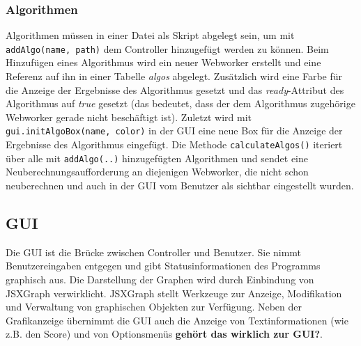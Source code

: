 \documentclass[a4paper,twocolumn]{scrartcl}
\begin{document}
\subsubsection{Algorithmen}
Algorithmen müssen in einer Datei als Skript abgelegt sein, um mit \texttt{addAlgo(name, path)} dem Controller hinzugefügt werden zu können. Beim Hinzufügen eines Algorithmus wird ein neuer Webworker erstellt und eine Referenz auf ihn in einer Tabelle \emph{algos} abgelegt. Zusätzlich wird eine Farbe für die Anzeige der Ergebnisse des Algorithmus gesetzt und das \emph{ready}-Attribut des Algorithmus auf \emph{true} gesetzt (das bedeutet, dass der dem Algorithmus zugehörige Webworker gerade nicht beschäftigt ist). Zuletzt wird mit \texttt{gui.initAlgoBox(name, color)} in der GUI eine neue Box für die Anzeige der Ergebnisse des Algorithmus eingefügt.
Die Methode \texttt{calculateAlgos()} iteriert über alle mit \texttt{addAlgo(..)} hinzugefügten Algorithmen und sendet eine Neuberechnungsaufforderung an diejenigen Webworker, die nicht schon neuberechnen und auch in der GUI vom Benutzer als sichtbar eingestellt wurden.

\subsection{GUI}
Die GUI ist die Brücke zwischen Controller und Benutzer. Sie nimmt Benutzereingaben entgegen und gibt Statusinformationen des Programms graphisch aus. Die Darstellung der Graphen wird durch Einbindung von JSXGraph verwirklicht. JSXGraph stellt Werkzeuge zur Anzeige, Modifikation und Verwaltung von graphischen Objekten zur Verfügung. Neben der Grafikanzeige übernimmt die GUI auch die Anzeige von Textinformationen (wie z.B. den Score) und von Optionsmenüs \textbf{gehört das wirklich zur GUI?}.
\end{document}
